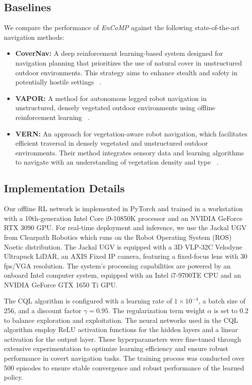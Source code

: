 \subsection{Baselines}
We compare the performance of \textit{EnCoMP} against the following state-of-the-art navigation methods:
\begin{itemize}

   \item \textbf{CoverNav:} A deep reinforcement learning-based system designed for navigation planning that prioritizes the use of natural cover in unstructured outdoor environments. This strategy aims to enhance stealth and safety in potentially hostile settings ~\cite{hossain2023covernav}.
    
    \item \textbf{VAPOR:} A method for autonomous legged robot navigation in unstructured, densely vegetated outdoor environments using offline reinforcement learning ~\cite{weerakoon2023vapor}.
    
    \item \textbf{VERN:} An approach for vegetation-aware robot navigation, which facilitates efficient traversal in densely vegetated and unstructured outdoor environments. Their method integrates sensory data and learning algorithms to navigate with an understanding of vegetation density and type ~\cite{sathyamoorthy2023vern}.
\end{itemize}


\subsection{Implementation Details}
Our offline RL network is implemented in PyTorch and trained in a workstation with a 10th-generation Intel Core i9-10850K processor and an NVIDIA GeForce RTX 3090 GPU. For real-time deployment and inference, we use the Jackal UGV from Clearpath Robotics which runs on the Robot Operating System (ROS) Noetic distribution. The Jackal UGV is equipped with a 3D VLP-32C Velodyne Ultrapuck LiDAR,  an AXIS Fixed IP camera, featuring a fixed-focus lens with 30 fps/VGA resolution. The system’s processing capabilities are powered by an onboard Intel computer system, equipped with an Intel i7-9700TE CPU and an NVIDIA GeForce GTX 1650 Ti GPU.


The CQL algorithm is configured with a learning rate of \(1 \times 10^{-4}\), a batch size of 256, and a discount factor \(\gamma = 0.95\). The regularization term weight \(\alpha\) is set to 0.2 to balance exploration and exploitation. The neural networks used in the CQL algorithm employ ReLU activation functions for the hidden layers and a linear activation for the output layer. These hyperparameters were fine-tuned through extensive experimentation to optimize learning efficiency and ensure robust performance in covert navigation tasks.
The training process was conducted over 500 episodes to ensure stable convergence and robust performance of the learned policy.

